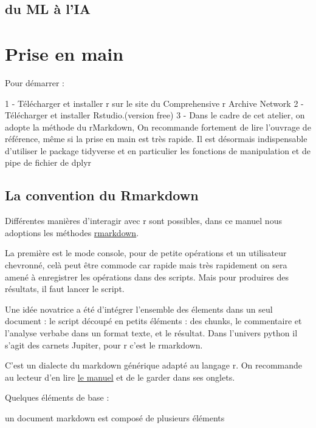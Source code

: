 \documentclass[
]{book}
\begin{document}
\hypertarget{du-ml-uxe0-lia}{%
\section{du ML à l'IA}\label{du-ml-uxe0-lia}}

\hypertarget{prise-en-main}{%
\chapter{Prise en main}\label{prise-en-main}}

Pour démarrer :

1 - Télécharger et installer r sur le site du Comprehensive r Archive Network
2 - Télécharger et installer Rstudio.(version free)
3 - Dans le cadre de cet atelier, on adopte la méthode du rMarkdown, On recommande fortement de lire l'ouvrage de référence, même si la prise en main est très rapide. Il est désormais indispensable d'utiliser le package tidyverse et en particulier les fonctions de manipulation et de pipe de fichier de dplyr

\hypertarget{la-convention-du-rmarkdown}{%
\section{La convention du Rmarkdown}\label{la-convention-du-rmarkdown}}

Différentes manières d'interagir avec r sont possibles, dans ce manuel nous adoptions les méthodes \href{https://rmarkdown.rstudio.com/lesson-1.html}{rmarkdown}.

La première est le mode console, pour de petite opérations et un utilisateur chevronné, celà peut être commode car rapide mais très rapidement on sera amené à enregistrer les opérations dans des scripts. Mais pour produires des résultats, il faut lancer le script.

Une idée novatrice a été d'intégrer l'ensemble des élements dans un seul document : le script découpé en petits éléments : des chunks, le commentaire et l'analyse verbabe dans un format texte, et le résultat. Dans l'univers python il s'agit des carnets Jupiter, pour r c'est le rmarkdown.

C'est un dialecte du markdown générique adapté au langage r. On recommande au lecteur d'en lire \href{https://bookdown.org/yihui/rmarkdown/}{le manuel} et de le garder dans ses onglets.

Quelques éléments de base :

un document markdown est composé de plusieurs éléments
\end{document}
